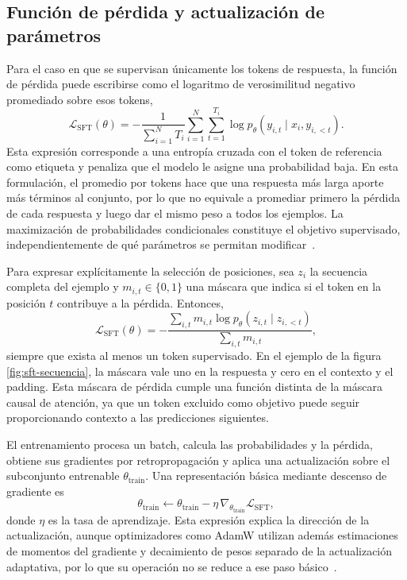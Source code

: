 \subsection{Función de pérdida y actualización de parámetros}
\label{sec:sft-actualizacion}
Para el caso en que se supervisan únicamente los tokens de respuesta, la función de pérdida puede escribirse como el logaritmo de verosimilitud negativo promediado sobre esos tokens,
\begin{equation}
\mathcal{L}_{\mathrm{SFT}}(\theta)=
-\frac{1}{\sum_{i=1}^{N}T_i}
\sum_{i=1}^{N}\sum_{t=1}^{T_i}
\log p_\theta(y_{i,t}\mid x_i,y_{i,<t}).
\label{eq:sft}
\end{equation}
Esta expresión corresponde a una entropía cruzada con el token de referencia como etiqueta y penaliza que el modelo le asigne una probabilidad baja. En esta formulación, el promedio por tokens hace que una respuesta más larga aporte más términos al conjunto, por lo que no equivale a promediar primero la pérdida de cada respuesta y luego dar el mismo peso a todos los ejemplos. La maximización de probabilidades condicionales constituye el objetivo supervisado, independientemente de qué parámetros se permitan modificar~\cite{hu2022lora}.

Para expresar explícitamente la selección de posiciones, sea $z_i$ la secuencia completa del ejemplo y $m_{i,t}\in\{0,1\}$ una máscara que indica si el token en la posición $t$ contribuye a la pérdida. Entonces,
\begin{equation}
\mathcal{L}_{\mathrm{SFT}}(\theta)=
-\frac{\sum_{i,t}m_{i,t}\log p_\theta(z_{i,t}\mid z_{i,<t})}
{\sum_{i,t}m_{i,t}},
\label{eq:sft-mascara}
\end{equation}
siempre que exista al menos un token supervisado. En el ejemplo de la figura \ref{fig:sft-secuencia}, la máscara vale uno en la respuesta y cero en el contexto y el padding. Esta máscara de pérdida cumple una función distinta de la máscara causal de atención, ya que un token excluido como objetivo puede seguir proporcionando contexto a las predicciones siguientes.

El entrenamiento procesa un batch, calcula las probabilidades y la pérdida, obtiene sus gradientes por retropropagación y aplica una actualización sobre el subconjunto entrenable $\theta_{\mathrm{train}}$. Una representación básica mediante descenso de gradiente es
\begin{equation}
\theta_{\mathrm{train}}\leftarrow\theta_{\mathrm{train}}
-\eta\,\nabla_{\theta_{\mathrm{train}}}\mathcal{L}_{\mathrm{SFT}},
\label{eq:sft-actualizacion}
\end{equation}
donde $\eta$ es la tasa de aprendizaje. Esta expresión explica la dirección de la actualización, aunque optimizadores como AdamW utilizan además estimaciones de momentos del gradiente y decaimiento de pesos separado de la actualización adaptativa, por lo que su operación no se reduce a ese paso básico~\cite{loshchilov2019adamw}.

